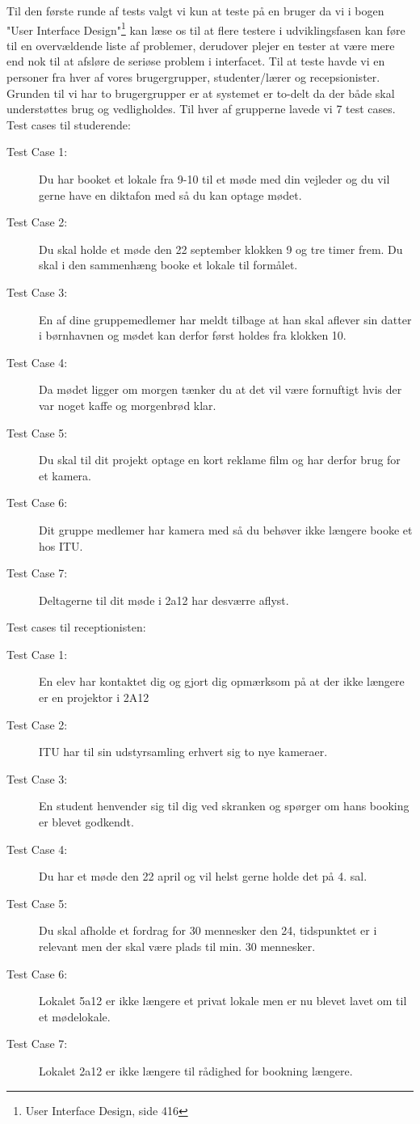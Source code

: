  Til den første runde af tests valgt vi kun at teste på en bruger da vi i bogen "User Interface Design"\footnote{User Interface Design, side 416} kan læse os til at flere testere i udviklingsfasen kan føre til en overvældende liste af problemer, derudover plejer en tester at være mere end nok til at afsløre de seriøse problem i interfacet.
Til at teste havde vi en personer fra hver af vores brugergrupper, studenter/lærer og recepsionister. Grunden til vi har to brugergrupper er at systemet er to-delt da der både skal understøttes brug og vedligholdes. Til hver af grupperne lavede vi 7 test cases.
Test cases til studerende:
\begin{description}
\item [Test Case 1:] Du har booket et lokale fra 9-10 til et møde med din vejleder og du vil gerne have en diktafon med så du kan optage mødet.
\item [Test Case 2:] Du skal holde et møde den 22 september klokken 9 og tre timer frem. Du skal i den sammenhæng booke et lokale til formålet.
\item [Test Case 3:] En af dine gruppemedlemer har meldt tilbage at han skal aflever sin datter i børnhavnen og mødet kan derfor først holdes fra klokken 10.
\item [Test Case 4:] Da mødet ligger om morgen tænker du at det vil være fornuftigt hvis der var noget kaffe og morgenbrød klar.
\item [Test Case 5:] Du skal til dit projekt optage en kort reklame film og har derfor brug for et kamera.
\item [Test Case 6:] Dit gruppe medlemer har kamera med så du behøver ikke længere booke et hos ITU.
\item [Test Case 7:] Deltagerne til dit møde i 2a12 har desværre aflyst.
\end{description}
Test cases til receptionisten:
\begin{description}
\item [Test Case 1:] En elev har kontaktet dig og gjort dig opmærksom på at der ikke længere er en projektor i 2A12
\item [Test Case 2:] ITU har til sin udstyrsamling erhvert sig to nye kameraer.
\item [Test Case 3:] En student henvender sig til dig ved skranken og spørger om hans booking er blevet godkendt.
\item [Test Case 4:] Du har et møde den 22 april og vil helst gerne holde det på 4. sal.
\item [Test Case 5:] Du skal afholde et fordrag for 30 mennesker den 24, tidspunktet er i relevant men der skal være plads til min. 30 mennesker.
\item [Test Case 6:] Lokalet 5a12 er ikke længere et privat lokale men er nu blevet lavet om til et mødelokale.
\item [Test Case 7:] Lokalet 2a12 er ikke længere til rådighed for bookning længere.
\end{description}
